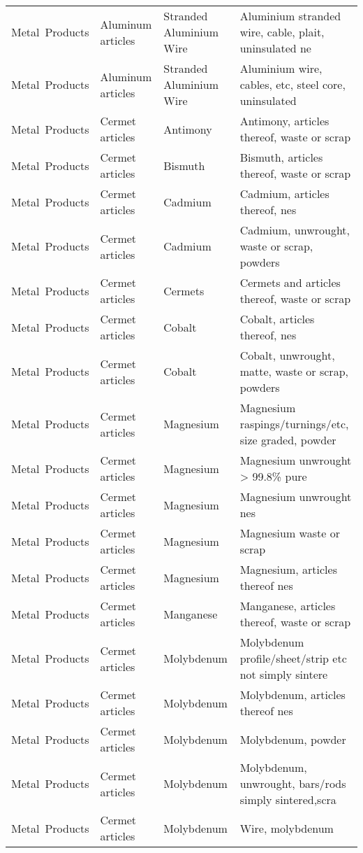 \begin{appendices}
\begin{xltabular}{\textwidth}{|p{0.10\textwidth}|p{0.25\textwidth}|p{0.20\textwidth}|p{0.35\textwidth}|}
		Metal\ Products & Aluminum articles & Stranded Aluminium Wire & Aluminium stranded wire, cable, plait, uninsulated ne \\
		Metal\ Products & Aluminum articles & Stranded Aluminium Wire & Aluminium wire, cables, etc, steel core, uninsulated \\
		Metal\ Products & Cermet articles & Antimony & Antimony, articles thereof, waste or scrap \\
		Metal\ Products & Cermet articles & Bismuth & Bismuth, articles thereof, waste or scrap \\
		Metal\ Products & Cermet articles & Cadmium & Cadmium, articles thereof, nes \\
		Metal\ Products & Cermet articles & Cadmium & Cadmium, unwrought, waste or scrap, powders \\
		Metal\ Products & Cermet articles & Cermets & Cermets and articles thereof, waste or scrap \\
		Metal\ Products & Cermet articles & Cobalt & Cobalt, articles thereof, nes \\
		Metal\ Products & Cermet articles & Cobalt & Cobalt, unwrought, matte, waste or scrap, powders \\
		Metal\ Products & Cermet articles & Magnesium & Magnesium raspings/turnings/etc, size graded, powder \\
		Metal\ Products & Cermet articles & Magnesium & Magnesium unwrought > 99.8\% pure \\
		Metal\ Products & Cermet articles & Magnesium & Magnesium unwrought nes \\
		Metal\ Products & Cermet articles & Magnesium & Magnesium waste or scrap \\
		Metal\ Products & Cermet articles & Magnesium & Magnesium, articles thereof nes \\
		Metal\ Products & Cermet articles & Manganese & Manganese, articles thereof, waste or scrap \\
		Metal\ Products & Cermet articles & Molybdenum & Molybdenum profile/sheet/strip etc not simply sintere \\
		Metal\ Products & Cermet articles & Molybdenum & Molybdenum, articles thereof nes \\
		Metal\ Products & Cermet articles & Molybdenum & Molybdenum, powder \\
		Metal\ Products & Cermet articles & Molybdenum & Molybdenum, unwrought, bars/rods simply sintered,scra \\
		Metal\ Products & Cermet articles & Molybdenum & Wire, molybdenum \\

\end{xltabular}
\end{appendices}
